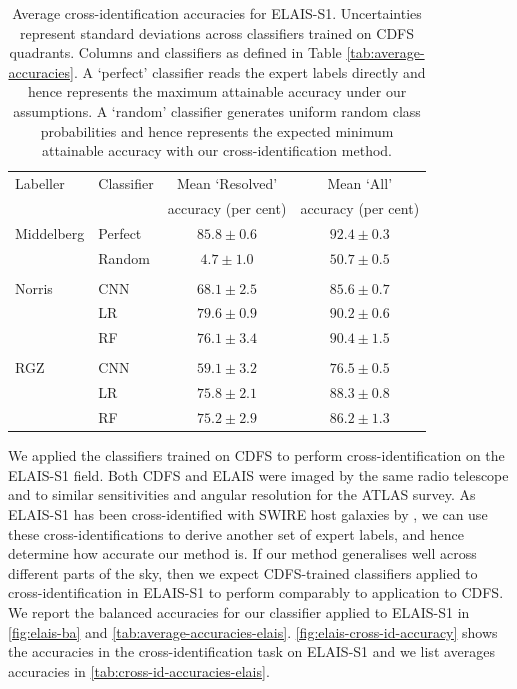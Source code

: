 \documentclass[fleqn,usenatbib,usedcolumn]{mnras}
\begin{document}
  \begin{table}
    \caption{Average cross-identification accuracies for ELAIS-S1.
      Uncertainties represent standard deviations across classifiers trained
      on CDFS quadrants. Columns and classifiers as defined in Table
      \ref{tab:average-accuracies}.  A `perfect' classifier reads the expert
      labels directly and hence represents the maximum attainable accuracy
      under our assumptions. A `random' classifier generates uniform random
      class probabilities and hence represents the expected minimum attainable
      accuracy with our cross-identification method.}
      \label{tab:cross-id-accuracies-elais}
    \begin{tabular}{llcc}
      \hline
      Labeller & Classifier  & Mean `Resolved' & Mean `All' \\
       & & accuracy (per cent) & accuracy (per cent)\\
      \hline
      Middelberg & Perfect & $85.8 \pm 0.6$ & $92.4 \pm 0.3$\\
                 & Random  & $4.7 \pm 1.0$  & $50.7 \pm 0.5$\\
       \\
      Norris & CNN     & $68.1 \pm 2.5$ & $85.6 \pm 0.7$\\
             & LR      & $79.6 \pm 0.9$ & $90.2 \pm 0.6$\\
             & RF      & $76.1 \pm 3.4$ & $90.4 \pm 1.5$\\
       \\
      RGZ & CNN & $59.1 \pm 3.2$ & $76.5 \pm 0.5$\\
          & LR  & $75.8 \pm 2.1$ & $88.3 \pm 0.8$\\
          & RF  & $75.2 \pm 2.9$ & $86.2 \pm 1.3$\\
       \hline
    \end{tabular}
  \end{table}

  We applied the classifiers trained on CDFS to perform cross-identification
  on the ELAIS-S1 field. Both CDFS and ELAIS were imaged by the same radio
  telescope and to similar sensitivities and angular resolution for the ATLAS
  survey.  As ELAIS-S1 has been cross-identified with SWIRE host galaxies by
  \citet{middelberg08}, we can use these cross-identifications to derive
  another set of expert labels, and hence determine how accurate our method
  is. If our method generalises well across different parts of the sky, then
  we expect CDFS-trained classifiers applied to cross-identification in
  ELAIS-S1 to perform comparably to application to CDFS. We report the
  balanced accuracies for our classifier applied to ELAIS-S1 in
  \autoref{fig:elais-ba} and \autoref{tab:average-accuracies-elais}.
  \autoref{fig:elais-cross-id-accuracy} shows the accuracies in the
  cross-identification task on ELAIS-S1 and we list averages accuracies in
  \autoref{tab:cross-id-accuracies-elais}.
\end{document}
